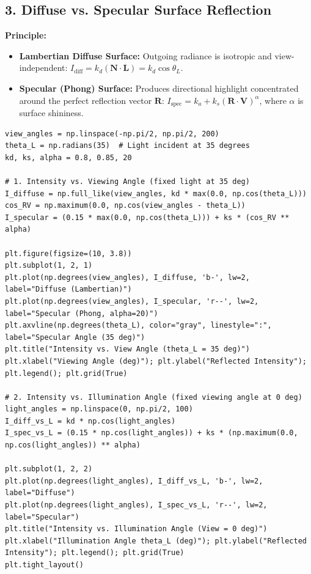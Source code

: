 \documentclass[12pt]{article}
\begin{document}
\subsection*{3. Diffuse vs. Specular Surface Reflection}
\textbf{Principle:} 
\begin{itemize}
    \item \textbf{Lambertian Diffuse Surface:} Outgoing radiance is isotropic and view-independent: $I_{\text{diff}} = k_d (\mathbf{N} \cdot \mathbf{L}) = k_d \cos\theta_L$.
    \item \textbf{Specular (Phong) Surface:} Produces directional highlight concentrated around the perfect reflection vector $\mathbf{R}$: $I_{\text{spec}} = k_a + k_s (\mathbf{R} \cdot \mathbf{V})^\alpha$, where $\alpha$ is surface shininess.
\end{itemize}

\begin{lstlisting}[style=code]
view_angles = np.linspace(-np.pi/2, np.pi/2, 200)
theta_L = np.radians(35)  # Light incident at 35 degrees
kd, ks, alpha = 0.8, 0.85, 20

# 1. Intensity vs. Viewing Angle (fixed light at 35 deg)
I_diffuse = np.full_like(view_angles, kd * max(0.0, np.cos(theta_L)))
cos_RV = np.maximum(0.0, np.cos(view_angles - theta_L))
I_specular = (0.15 * max(0.0, np.cos(theta_L))) + ks * (cos_RV ** alpha)

plt.figure(figsize=(10, 3.8))
plt.subplot(1, 2, 1)
plt.plot(np.degrees(view_angles), I_diffuse, 'b-', lw=2, label="Diffuse (Lambertian)")
plt.plot(np.degrees(view_angles), I_specular, 'r--', lw=2, label="Specular (Phong, alpha=20)")
plt.axvline(np.degrees(theta_L), color="gray", linestyle=":", label="Specular Angle (35 deg)")
plt.title("Intensity vs. View Angle (theta_L = 35 deg)")
plt.xlabel("Viewing Angle (deg)"); plt.ylabel("Reflected Intensity"); plt.legend(); plt.grid(True)

# 2. Intensity vs. Illumination Angle (fixed viewing angle at 0 deg)
light_angles = np.linspace(0, np.pi/2, 100)
I_diff_vs_L = kd * np.cos(light_angles)
I_spec_vs_L = (0.15 * np.cos(light_angles)) + ks * (np.maximum(0.0, np.cos(light_angles)) ** alpha)

plt.subplot(1, 2, 2)
plt.plot(np.degrees(light_angles), I_diff_vs_L, 'b-', lw=2, label="Diffuse")
plt.plot(np.degrees(light_angles), I_spec_vs_L, 'r--', lw=2, label="Specular")
plt.title("Intensity vs. Illumination Angle (View = 0 deg)")
plt.xlabel("Illumination Angle theta_L (deg)"); plt.ylabel("Reflected Intensity"); plt.legend(); plt.grid(True)
plt.tight_layout()
\end{lstlisting}
\end{document}
